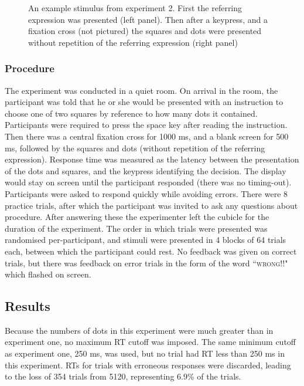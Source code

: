 \documentclass[doc,floatmark]{apa}
\begin{document}
\begin{figure}[tbp]
\caption{An example stimulus from experiment 2. First the referring expression was presented (left panel). Then after a keypress, and a fixation cross (not pictured) the squares and dots were presented without repetition of the referring expression (right panel)}
\label{stimuluse2}
\end{figure}

\subsubsection{Procedure}

The experiment was conducted in a quiet room. On arrival in the room, the participant was told that he or she would be presented with an instruction to choose one of two squares by reference to how many dots it contained. Participants were required to press the space key after reading the instruction. Then there was a central fixation cross for 1000 ms, and a blank screen for 500 ms, followed by the squares and dots (without repetition of the referring expression). Response time was measured as the latency between the presentation of the dots and squares, and the keypress identifying the decision. The display would stay on screen until the participant responded (there was no timing-out). Participants were asked to respond quickly while avoiding errors. There were 8 practice trials, after which the participant was invited to ask any questions about procedure. After answering these the experimenter left the cubicle for the duration of the experiment. The order in which trials were presented was randomised per-participant, and stimuli were presented in 4 blocks of 64 trials each, between which the participant could rest. No feedback was given on correct trials, but there was feedback on error trials in the form of the word ``\textsc{wrong!!}" which flashed on screen.

\subsection{Results}

Because the numbers of dots in this experiment were much greater than in experiment one, no maximum RT cutoff was imposed. The same minimum cutoff as experiment one, 250 ms, was used, but no trial had RT less than 250 ms in this experiment. RTs for trials with erroneous responses were discarded, leading to the loss of 354 trials from 5120, representing 6.9\% of the trials.
\end{document}
